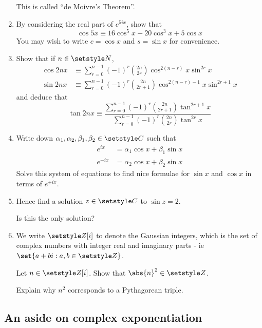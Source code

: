 \begin{enumerate}
  This is called ``de Moivre's Theorem''.
 \item
  By considering the real part of \(e^{5ix}\), show that
  \begin{equation*}
   \cos 5x \equiv 16\cos^5 x - 20\cos^3 x + 5\cos x
  \end{equation*}
  You may wish to write \(c = \cos x\) and \(s = \sin x\) for convenience.
 \item
  Show that if \(n \in \Naturals\),
  \begin{align*}
   \cos 2nx &\equiv
    \sum_{r = 0}^{n - 1}
     (-1)^r \binom{2n}{2r} \cos^{2(n - r)} x \sin^{2r} x \\
   \sin 2nx &\equiv
    \sum_{r = 0}^{n - 1}
     (-1)^r \binom{2n}{2r + 1} \cos^{2(n - r) - 1} x \sin^{2r + 1} x
  \end{align*}
  and deduce that
  \begin{equation*}
   \tan 2nx \equiv
   \frac{\sum_{r = 0}^{n - 1} (-1)^r \binom{2n}{2r + 1} \tan^{2r + 1} x}
        {\sum_{r = 0}^{n - 1} (-1)^r \binom{2n}{2r} \tan^{2r} x}
  \end{equation*}
 \item
  Write down \(\alpha_1, \alpha_2, \beta_1, \beta_2 \in \Complex\) such that
  \begin{align*}
   e^{ix} &= \alpha_1 \cos x + \beta_1 \sin x \\
   e^{-ix} &= \alpha_2 \cos x + \beta_2 \sin x
  \end{align*}
  Solve this system of equations to find nice formulae for
  \(\sin x\) and \(\cos x\) in terms of \(e^{\pm ix}\).
 \item
  Hence find a solution \(z \in \Complex\) to \(\sin z = 2\).

  Is this the only solution?
 \item
  We write \(\Integers[i]\) to denote the Gaussian integers, which is the set of
  complex numbers with integer real and imaginary parts - ie
  \(\set{a + bi : a, b \in \Integers}\).

  Let \(n \in \Integers[i]\). Show that \(\abs{n}^2 \in \Integers\).

  Explain why \(n^2\) corresponds to a Pythagorean triple.
\end{enumerate}

\subsection{An aside on complex exponentiation}
